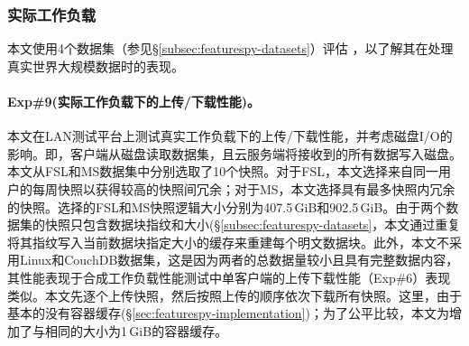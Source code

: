 \subsubsection{实际工作负载}
\label{subsubsec:featurespy-real}
本文使用4个数据集（参见\S\ref{subsec:featurespy-datasets}）评估 \prototype，以了解其在处理真实世界大规模数据时的表现。

\paragraph*{Exp\#9(实际工作负载下的上传/下载性能)。}本文在LAN测试平台上测试真实工作负载下的上传/下载性能，并考虑磁盘I/O的影响。即，客户端从磁盘读取数据集，且云服务端将接收到的所有数据写入磁盘。本文从FSL和MS数据集中分别选取了10个快照。对于FSL，本文选择来自同一用户的每周快照以获得较高的快照间冗余；对于MS，本文选择具有最多快照内冗余的快照。选择的FSL和MS快照逻辑大小分别为407.5\,GiB和902.5\,GiB。由于两个数据集的快照只包含数据块指纹和大小(\S\ref{subsec:featurespy-datasets}，本文通过重复将其指纹写入当前数据块指定大小的缓存来重建每个明文数据块。此外，本文不采用Linux和CouchDB数据集，这是因为两者的总数据量较小且具有完整数据内容，其性能表现于合成工作负载性能测试中单客户端的上传下载性能（Exp\#6）表现类似。本文先逐个上传快照，然后按照上传的顺序依次下载所有快照。这里，由于基本的\sysnameS 没有容器缓存(\S\ref{sec:featurespy-implementation})；为了公平比较，本文为\sysnameS 增加了与\prototype 相同的大小为1\,GiB的容器缓存。

